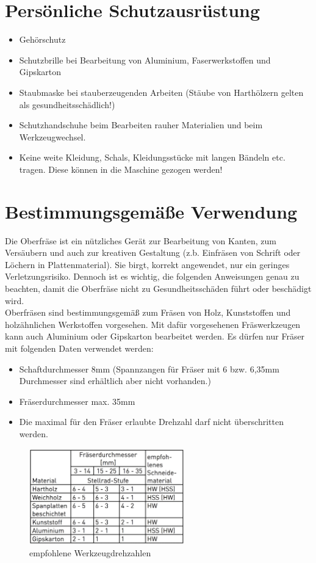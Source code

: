 \documentclass{\basedir/fablab-document}
\begin{document}
\newpage

\section{Persönliche Schutzausrüstung}

\begin{itemize}
\item Gehörschutz
\item Schutzbrille bei Bearbeitung von Aluminium, Faserwerkstoffen und Gipskarton
\item Staubmaske bei stauberzeugenden Arbeiten (Stäube von Harthölzern gelten als gesundheitsschädlich!)
\item Schutzhandschuhe beim Bearbeiten rauher Materialien und beim Werkzeugwechsel.
\item Keine weite Kleidung, Schals, Kleidungsstücke mit langen Bändeln etc. tragen. Diese können in die Maschine gezogen werden!
\end{itemize}

\section{Bestimmungsgemäße Verwendung}
Die Oberfräse ist ein nützliches Gerät zur Bearbeitung von Kanten, zum Versäubern und auch zur kreativen Gestaltung (z.b. Einfräsen von Schrift oder Löchern in Plattenmaterial). Sie birgt, korrekt angewendet, nur ein geringes Verletzungsrisiko. Dennoch ist es wichtig, die folgenden Anweisungen genau zu beachten, damit die Oberfräse nicht zu Gesundheitsschäden führt oder beschädigt wird.\\

Oberfräsen sind bestimmungsgemäß zum Fräsen von Holz, Kunststoffen und holzähnlichen Werkstoffen vorgesehen. Mit dafür vorgesehenen Fräswerkzeugen kann auch Aluminium oder Gipskarton bearbeitet werden. Es dürfen nur Fräser mit folgenden Daten verwendet werden:

\begin{itemize}
\item Schaftdurchmesser 8mm (Spannzangen für Fräser mit 6 bzw. 6,35mm Durchmesser sind erhältlich aber nicht vorhanden.)
\item Fräserdurchmesser max. 35mm
\item Die maximal für den Fräser erlaubte Drehzahl darf nicht überschritten werden.
\end{itemize}

\begin{figure}[]
	\centering
	\includegraphics[width=0.6\textwidth]{img/schnittwerte.jpg}
	\caption{empfohlene Werkzeugdrehzahlen}
	\label{fig:werkzeugdrehzahl}
\end{figure}
\end{document}

